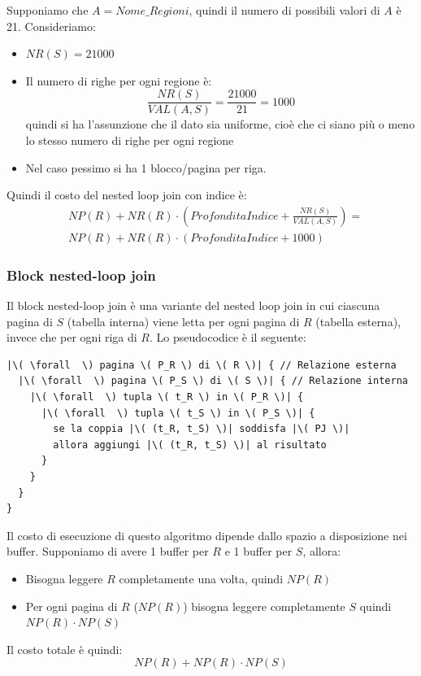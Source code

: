 \documentclass[a4paper,twoside]{article}
\begin{document}
\begin{example}
  Supponiamo che \( A = Nome\_Regioni \), quindi il numero di possibili valori di
  \( A \) è 21. Consideriamo:
  \begin{itemize}
    \item \( NR(S) = 21000 \) 
    \item Il numero di righe per ogni regione è:
      \[
        \frac{NR(S)}{VAL(A,S)} = \frac{21000}{21} = 1000
      \] 
      quindi si ha l'assunzione che il dato sia uniforme, cioè che ci siano più o
      meno lo stesso numero di righe per ogni regione
    \item Nel caso pessimo si ha 1 blocco/pagina per riga.
  \end{itemize}
  Quindi il costo del nested loop join con indice è:
  \[
    \begin{aligned}
      &NP(R) + NR(R) \cdot \left( ProfonditaIndice + \frac{NR(S)}{VAL(A,S)} \right) =\\
      &NP(R) + NR(R) \cdot \left( ProfonditaIndice + 1000 \right)
    \end{aligned}
  \]

\end{example}

\subsubsection*{Block nested-loop join}
Il block nested-loop join è una variante del nested loop join in cui ciascuna pagina
di \( S \) (tabella interna) viene letta per ogni pagina di \( R \) (tabella esterna),
invece che per ogni riga di \( R \). Lo pseudocodice è il seguente:
\begin{lstlisting}[escapechar=|, basicstyle=\rmfamily, columns=fullflexible, keepspaces=true]
|\( \forall  \) pagina \( P_R \) di \( R \)| { // Relazione esterna
  |\( \forall  \) pagina \( P_S \) di \( S \)| { // Relazione interna
    |\( \forall  \) tupla \( t_R \) in \( P_R \)| {
      |\( \forall  \) tupla \( t_S \) in \( P_S \)| {
        se la coppia |\( (t_R, t_S) \)| soddisfa |\( PJ \)|
        allora aggiungi |\( (t_R, t_S) \)| al risultato
      }
    }
  }
}
\end{lstlisting}

\noindent
Il costo di esecuzione di questo algoritmo dipende dallo spazio a disposizione nei
buffer. Supponiamo di avere 1 buffer per \( R \) e 1 buffer per \( S \), allora:
\begin{itemize}
  \item Bisogna leggere \( R \) completamente una volta, quindi \( NP(R) \)
  \item Per ogni pagina di \( R \) (\( NP(R) \)) bisogna leggere completamente \( S \)
    quindi \( NP(R) \cdot NP(S) \)
\end{itemize}
Il costo totale è quindi:
\[
  NP(R) + NP(R) \cdot NP(S)
\] 
\end{document}
